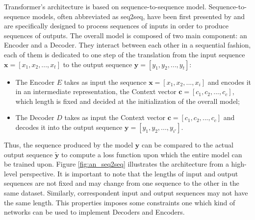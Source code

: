             Transformer's architecture is based on sequence-to-sequence model. Sequence-to-sequence models, often abbreviated as seq2seq, have been first presented by  and are specifically designed to process sequences of inputs in order to produce sequences of outputs. \newline
            The overall model is composed of two main component: an Encoder and a Decoder. They interact between each other in a sequential fashion, each of them is dedicated to one step of the translation from the input sequence $\mathbf{x} = [x_1, x_2, ..., x_t]$ to the output sequence $\mathbf{y} = \left[y_1, y_2, ..., y_t \right]$:
            \begin{itemize}[topsep=0.5em, partopsep=0.5em]
                \setlength\itemsep{0em}
                \item The Encoder $E$ takes as input the sequence $\mathbf{x} = [x_1, x_2, ..., x_i]$ and encodes it in an intermediate representation, the Context vector $\mathbf{c} = [ c_1, c_2, ..., c_c]$, which length is fixed and decided at the initialization of the overall model;
                \item The Decoder $D$ takes as input the Context vector $\mathbf{c} = [ c_1, c_2, ..., c_c]$ and decodes it into the output sequence $\mathbf{y} = \left[y_1, y_2, ..., y_{i'} \right]$.
            \end{itemize}
            \noindent
            Thus, the sequence produced by the model $\mathbf{y}$ can be compared to the actual output sequence $\mathbf{\tilde{y}}$ to compute a loss function upon which the entire model can be trained upon. Figure \ref{fig:an_seq2seq} illustrates the architecture from a high-level perspective. \newline
            It is important to note that the lengths of input and output sequences are not fixed and may change from one sequence to the other in the same dataset. Similarly, correspondent input and output sequences may not have the same length. This properties imposes some constraints one which kind of networks can be used to implement Decoders and Encoders.
            
